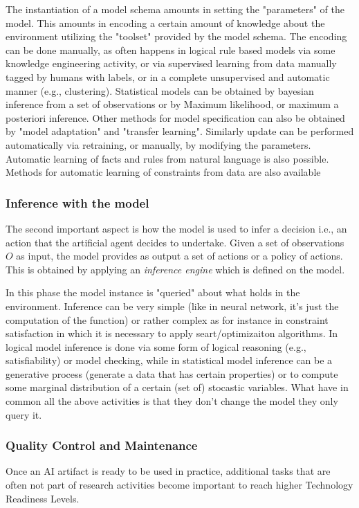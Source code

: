 The instantiation of a model schema amounts in setting the "parameters" of the model. This amounts in encoding a certain amount of knowledge about the environment utilizing the "toolset" provided by the model schema. The encoding can be done manually, as often happens in logical rule based models via some knowledge engineering activity, or via supervised learning from data manually tagged by humans with labels, or in a complete unsupervised and automatic manner (e.g., clustering). Statistical models can be obtained by bayesian inference from a set of observations or by Maximum likelihood, or maximum a posteriori inference. Other methods for model specification can also be obtained by "model adaptation" and "transfer learning". Similarly update can be performed automatically via retraining, or manually, by modifying the parameters. Automatic learning of facts and rules from natural language is also possible. Methods for automatic learning of constraints from data are also available

\subsubsection{Inference with the model}
The second important aspect is how the model is used to infer a
decision i.e., an action that the artificial agent decides to
undertake. Given a set of observations $O$ as input, the model
provides as output a set of actions or a policy of actions. This is
obtained by applying an \emph{inference engine} which is defined on
the model.

In this phase the model instance is "queried" about what holds in the
environment. Inference can be very simple (like in neural network,
it's just the computation of the function) or rather complex as for
instance in constraint satisfaction in which it is necessary to apply
seart/optimizaiton algorithms. In logical model inference is done via
some form of logical reasoning (e.g., satisfiability) or model
checking, while in statistical model inference can be a generative
process (generate a data that has certain properties) or to compute
some marginal distribution of a certain (set of) stocastic
variables. What have in common all the above activities is that they
don't change the model they only query it.

\subsubsection{Quality Control and  Maintenance}
Once an AI artifact is ready to be used in practice,
additional tasks that are often not part of research activities become important
to reach higher Technology Readiness Levels.

